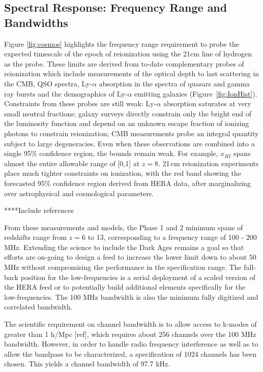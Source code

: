 \documentclass{article}
\begin{document}
\subsection{Spectral Response:  Frequency Range and Bandwidths}
Figure \ref{fig:cosmos} highlights the frequency range requirement to probe the expected timescale of the epoch of reionization using the 21cm line of hydrogen as the probe.  
These limits are derived from to-date complementary probes of reionization which include measurements of
the optical depth to last scattering in the CMB, QSO spectra, Ly-$\alpha$
absorption in the spectra of quasars and gamma ray bursts and the demographics
of Ly-$\alpha$ emitting galaxies
(Figure~\ref{fig:IonHist}). 
Constraints from these probes are still weak:
Ly-$\alpha$ absorption saturates at very small neutral fractions; galaxy
surveys directly constrain only the bright end of the luminosity function and
depend on an unknown escape fraction of ionizing photons to constrain
reionization; CMB measurements probe an integral quantity subject
to large degeneracies. Even when these observations are
combined into a single 95\% confidence region, the bounds remain weak.
For example, $x_{HI}$ spans almost the entire allowable range of [0,1]
at $z=8$. 21\,cm reionization experiments place much tighter constraints on ionization, with the
red band showing the forecasted 95\% confidence region derived from HERA data,
after marginalizing over astrophysical and cosmological parameters.

****Include references

From these measurements and models, the Phase 1 and 2 minimum spans of redshifts range from $z=$6 to 13, corresponding to a frequency range of 100 - 200 MHz.  Extending the science to include the Dark Ages remains a goal so that efforts are on-going to design a feed to increase the lower limit down to about 50 MHz without compromising the performance in the specification range.  The fall-back position for the low-frequencies is a serial deployment of a scaled version of the HERA feed or to potentially build additional elements specifically for the low-frequencies.  The 100 MHz bandwidth is also the minimum fully digitized and correlated bandwidth.

The scientific requirement on channel bandwidth is to allow access to k-modes of greater than 1 h/Mpc [ref], which requires about 256 channels over the 100 MHz bandwidth.  However, in order to handle radio frequency interference as well as to allow the bandpass to be characterized, a specification of 1024 channels has been chosen.  This yields a channel bandwidth of 97.7 kHz.
\end{document}
